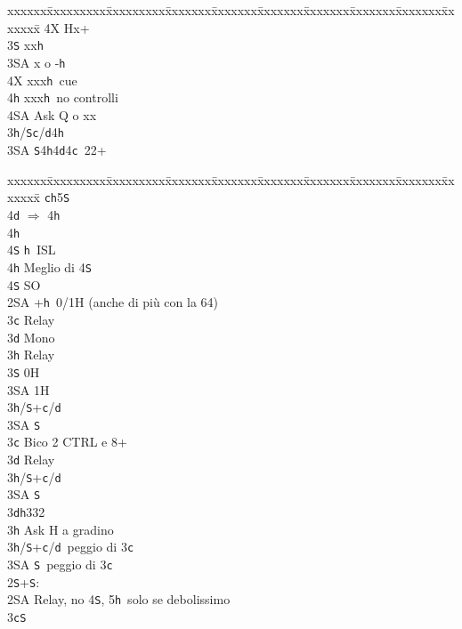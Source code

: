 \documentclass[a4paper,italian]{article}
\newcommand{\BS}{\small{\texttt{S}}}
\newcommand{\BC}{\small{\texttt{c}}}
\newcommand{\BD}{\small{\texttt{d}}}
\newcommand{\BH}{\small{\texttt{h}}}
\newenvironment{bidtable}
{\begin{tabbing}

    xxxxxx\=xxxxxxxxx\=xxxxxxxxx\=xxxxxxx\=xxxxxxx\=xxxxxxx\=xxxxxxx\=xxxxxxx\=xxxxxxx\=xxxxxxx\=\kill}
{\end{tabbing} }%
\begin{document}
\begin{multicols}{2}
\begin{bidtable}
        4X \> Hx+\-\-\\
        3\BS \> xx\BH \\
        3\small{SA} \> x o -\BH \\
        4X \> xxx\BH\ cue\\
        4\BH \> xxx\BH\ no controlli\+\\
        4\small{SA} \>Ask Q o xx\-\-\\
        3\BH/\BS {}\BC /\BD 4\BH \\
        3\small{SA} \BS 4\BH 4\BD 4\BC\ 22+\\
    \end{bidtable}
    \vfill\null
    \columnbreak
    \begin{bidtable}
        \>\>\BC {}\BH 5\BS \+\+\+\+\\
        4\BD \> $\Rightarrow$ 4\BH \+\\
        4\BH\+\\
        4\BS \> \BH\ ISL\-\-\\
        4\BH \> Meglio di 4\BS \\
        4\BS \> SO\-\-\\
        2\small{SA} +\BH\ 0/1H (anche di più con la 64)\+\\
        3\BC \> Relay\+\\
        3\BD \> Mono\+\\
        3\BH \> Relay\+\\
        3\BS \> 0H\\
        3\small{SA} \> 1H\-\-\\
        3\BH/\BS {}+\BC /\BD \\
        3\small{SA} \BS \-\-\\
        3\BC \> Bico 2 CTRL e 8+\+\\
        3\BD \> Relay\+\\
        3\BH/\BS {}+\BC /\BD \\
        3\small{SA} \BS \-\-\\
        3\BD {}\BH 332\+\\
        3\BH \> Ask H a gradino\-\\
        3\BH/\BS {}+\BC /\BD\ peggio di 3\BC \\
        3\small{SA} \BS\ peggio di 3\BC \-\\
        2\BS {}+\BS :\+\\
        2\small{SA} \> Relay, no 4\BS , 5\BH\ solo se debolissimo\+\\
        3\BC {}\BS \+\\

\end{bidtable}
\end{multicols}
\end{document}
